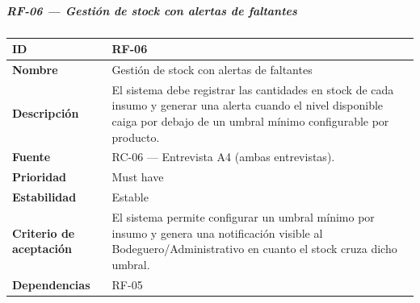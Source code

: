 \documentclass[
]{article}
\newcounter{none} %
\begin{document}
\subparagraph{RF-06 --- Gestión de stock con alertas de
faltantes}\label{rf-06-gestiuxf3n-de-stock-con-alertas-de-faltantes}

{\def\LTcaptype{none} %
\begin{longtable}[]{@{}
  >{\raggedright\arraybackslash}p{}
  >{\raggedright\arraybackslash}p{}@{}}
\toprule\noalign{}
\begin{minipage}[b]{\linewidth}\raggedright
\textbf{ID}
\end{minipage} & \begin{minipage}[b]{\linewidth}\raggedright
RF-06
\end{minipage} \\
\midrule\noalign{}
\endhead
\bottomrule\noalign{}
\endlastfoot
\textbf{Nombre} & \begin{minipage}[t]{\linewidth}\raggedright
Gestión de stock con alertas de faltantes
\end{minipage} \\
\textbf{Descripción} & \begin{minipage}[t]{\linewidth}\raggedright
El sistema debe registrar las cantidades en stock de cada insumo y
generar una alerta cuando el nivel disponible caiga por debajo de un
umbral mínimo configurable por producto.
\end{minipage} \\
\textbf{Fuente} & \begin{minipage}[t]{\linewidth}\raggedright
RC-06 --- Entrevista A4 (ambas entrevistas).
\end{minipage} \\
\textbf{Prioridad} & \begin{minipage}[t]{\linewidth}\raggedright
Must have
\end{minipage} \\
\textbf{Estabilidad} & \begin{minipage}[t]{\linewidth}\raggedright
Estable
\end{minipage} \\
\textbf{Criterio de aceptación} &
\begin{minipage}[t]{\linewidth}\raggedright
El sistema permite configurar un umbral mínimo por insumo y genera una
notificación visible al Bodeguero/Administrativo en cuanto el stock
cruza dicho umbral.
\end{minipage} \\
\textbf{Dependencias} & \begin{minipage}[t]{\linewidth}\raggedright
RF-05
\end{minipage} \\
\end{longtable}
}
\end{document}
